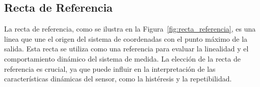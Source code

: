 







\subsection{Recta de Referencia}

La recta de referencia, como se ilustra en la Figura~\ref{fig:recta_referencia}, es una linea que une el origen del sistema de coordenadas con el punto máximo de la salida. Esta recta se utiliza como una referencia para evaluar la linealidad y el comportamiento dinámico del sistema de medida. La elección de la recta de referencia es crucial, ya que puede influir en la interpretación de las características dinámicas del sensor, como la histéresis y la repetibilidad.

